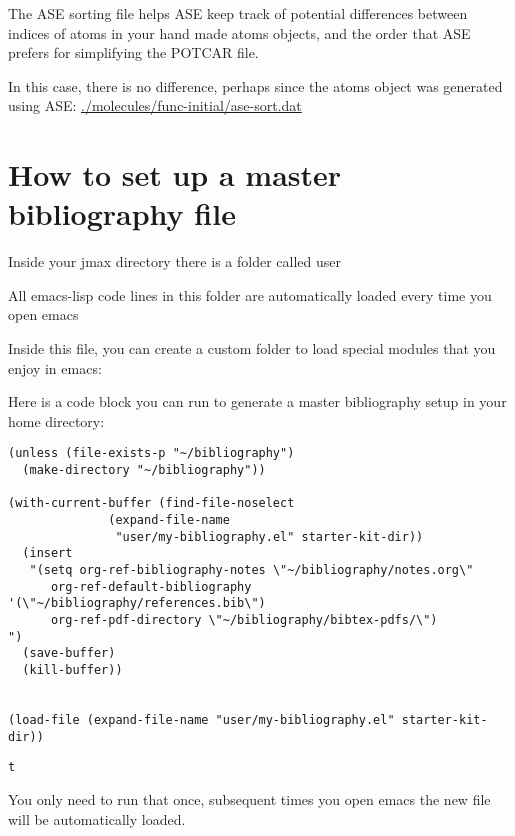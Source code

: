 \documentclass[11pt]{article}
\begin{document}
The ASE sorting file helps ASE keep track of potential differences between indices of atoms in your hand made atoms objects, and the order that ASE prefers for simplifying the POTCAR file.

In this case, there is no difference, perhaps since the atoms object was generated using ASE:
\url{./molecules/func-initial/ase-sort.dat}


\section{How to set up a master bibliography file}
\label{sec-3}

Inside your jmax directory there is a folder called user

All emacs-lisp code lines in this folder are automatically loaded every time you open emacs

Inside this file, you can create a custom folder to load special modules that you enjoy in emacs:

Here is a code block you can run to generate a master bibliography setup in your home directory:

\begin{verbatim}
(unless (file-exists-p "~/bibliography")
  (make-directory "~/bibliography"))

(with-current-buffer (find-file-noselect
		      (expand-file-name
		       "user/my-bibliography.el" starter-kit-dir))
  (insert
   "(setq org-ref-bibliography-notes \"~/bibliography/notes.org\"
      org-ref-default-bibliography '(\"~/bibliography/references.bib\")
      org-ref-pdf-directory \"~/bibliography/bibtex-pdfs/\")
")
  (save-buffer)
  (kill-buffer))


(load-file (expand-file-name "user/my-bibliography.el" starter-kit-dir))
\end{verbatim}

\begin{verbatim}
t
\end{verbatim}

You only need to run that once, subsequent times you open emacs the new file will be automatically loaded.
\end{document}
